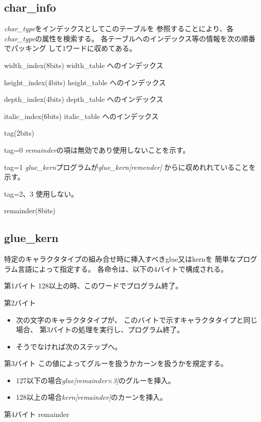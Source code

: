 \documentclass[twoside]{jarticle}
\begin{document}
\subsection{char\_info}
{\it char\_type}をインデックスとしてこのテーブルを
参照することにより、各{\it char\_type}の属性を検索する。
各テーブルへのインデックス等の情報を次の順番でパッキング
して1ワードに収めてある。
\begin{description}
\item{width\_index(8bits)} width\_table へのインデックス
\item{height\_index(4bits)} height\_table へのインデックス
\item{depth\_index(4bits)} depth\_table へのインデックス
\item{italic\_index(6bits)} italic\_table へのインデックス
\item{tag(2bits)}
	\begin{description}
	\item{tag=0} {\it remainder}の項は無効であり使用しないことを示す。
	\item{tag=1} {\it glue\_kern}プログラムが{\it glue\_kern[remender]}
		からに収めれれていることを示す。
	\item{tag=2、3} 使用しない。
	\end{description}
\item{remainder(8bits)}
\end{description}
%
\subsection{glue\_kern}
特定のキャラクタタイプの組み合せ時に挿入すべきglue又はkernを
簡単なプログラム言語によって指定する。
各命令は、以下の4バイトで構成される。
\begin{description}
\item{第1バイト} 128以上の時、このワードでプログラム終了。
\item{第2バイト}
	\begin{itemize}
	\item 次の文字のキャラクタタイプが、
		このバイトで示すキャラクタタイプと同じ場合、
		第3バイトの処理を実行し、プログラム終了。
	\item そうでなければ次のステップへ。
	\end{itemize}
\item{第3バイト}
	この値によってグルーを扱うかカーンを扱うかを規定する。
	\begin{itemize}
	\item 127以下の場合{\it glue[remainder$\times$3]}のグルーを挿入。
	\item 128以上の場合{\it kern[remainder]}のカーンを挿入。
	\end{itemize}
\item{第4バイト} remainder
\end{description}
\end{document}
